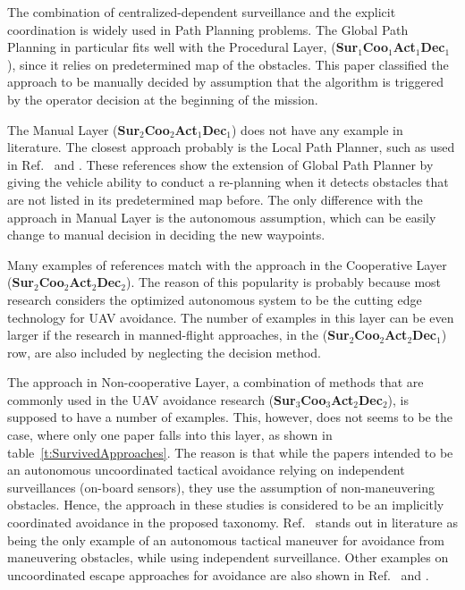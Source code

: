 The combination of centralized-dependent surveillance and the explicit coordination is widely used in Path Planning problems. The Global Path Planning in particular fits well with the Procedural Layer, (\textbf{Sur$_1$Coo$_1$Act$_1$Dec$_1$}), since it relies on predetermined map of the obstacles. This paper classified the approach to be manually decided by assumption that the algorithm is triggered by the operator decision at the beginning of the mission.

The Manual Layer (\textbf{Sur$_2$Coo$_2$Act$_1$Dec$_1$}) does not have any example in literature. The closest approach probably is the Local Path Planner, such as used in Ref.~\cite{Beard:02} and \cite{Duan:09}. These references show the extension of Global Path Planner by giving the vehicle ability to conduct a re-planning when it detects obstacles that are not listed in its predetermined map before. The only difference with the approach in Manual Layer is the autonomous assumption, which can be easily change to manual decision in deciding the new waypoints.

Many examples of references match with the approach in the Cooperative Layer (\textbf{Sur$_2$Coo$_2$Act$_2$Dec$_2$}). The reason of this popularity is probably because most research considers the optimized autonomous system to be the cutting edge technology for UAV avoidance. The number of examples in this layer can be even larger if the research in manned-flight approaches, in the (\textbf{Sur$_2$Coo$_2$Act$_2$Dec$_1$}) row, are also included by neglecting the decision method.

The approach in Non-cooperative Layer, a combination of methods that are commonly used in the UAV avoidance research (\textbf{Sur$_3$Coo$_3$Act$_2$Dec$_2$}), is supposed to have a number of examples. This, however, does not seems to be the case, where only one paper falls into this layer, as shown in table~\ref{t:SurvivedApproaches}. The reason is that while the papers intended to be an autonomous uncoordinated tactical avoidance relying on independent surveillances (on-board sensors), they use the assumption of non-maneuvering obstacles. Hence, the approach in these studies is considered to be an implicitly coordinated avoidance in the proposed taxonomy. Ref.~\cite{Rathbun:02} stands out in literature as being the only example of an autonomous tactical maneuver for avoidance from maneuvering obstacles, while using independent surveillance. Other examples on uncoordinated escape approaches for avoidance are also shown in Ref.~\cite{Teo:04} and \cite{Winder:99}.

